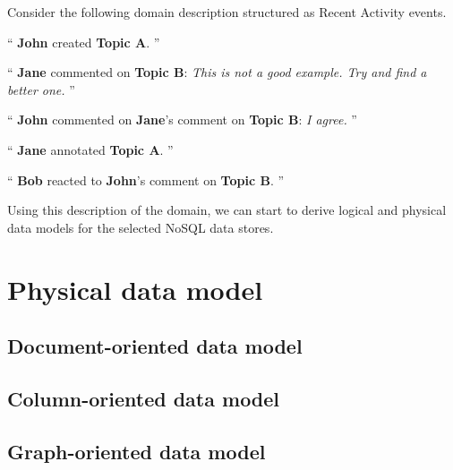 Consider the following domain description structured as Recent Activity events.

``
\textbf{John} created \textbf{Topic A}.
''

``
\textbf{Jane} commented on \textbf{Topic B}:
\textit{This is not a good example. Try and find a better one.}
''

``
\textbf{John} commented on \textbf{Jane}'s comment on \textbf{Topic B}:
\textit{I agree.}
''

``
\textbf{Jane} annotated \textbf{Topic A}.
''

``
\textbf{Bob} reacted to \textbf{John}'s comment on \textbf{Topic B}.
''

Using this description of the domain, we can start to derive logical and physical data models for the selected NoSQL data stores.

\section{Physical data model}
\label{sec:physical-data-model}

\subsection{Document-oriented data model}
\label{subsec:document-data-model}

\subsection{Column-oriented data model}
\label{subsec:column-data-model}

\subsection{Graph-oriented data model}
\label{subsec:graph-data-model}
